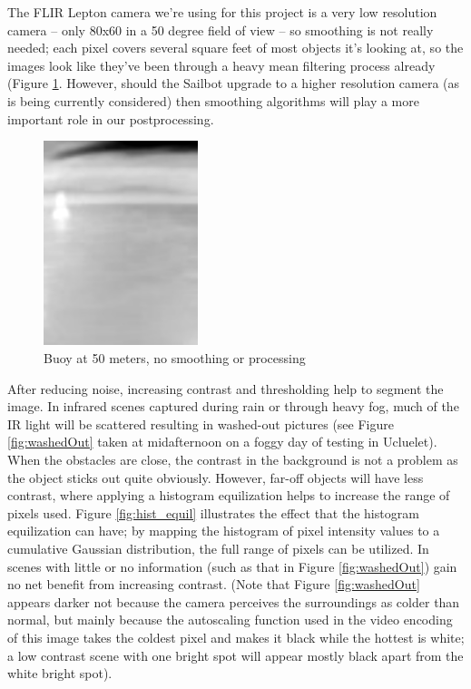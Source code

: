 The FLIR Lepton camera we're using for this project is a very low resolution camera -- only 80x60 in a 50 degree field of view -- so smoothing is not really needed; each pixel covers several square feet of most objects it's looking at, so the images look like they've been through a heavy mean filtering process already (Figure \ref{fig:buoy_ex}. However, should the Sailbot upgrade to a higher resolution camera (as is being currently considered) then smoothing algorithms will play a more important role in our postprocessing. 

\begin{figure}[h]
\centering
\includegraphics[width=0.4\textwidth]{"./image/buoy_example"}
\caption{Buoy at 50 meters, no smoothing or processing}
\label{fig:buoy_ex}
\end{figure}

After reducing noise, increasing contrast and thresholding help to segment the image. In infrared scenes captured during rain or through heavy fog, much of the IR light will be scattered resulting in washed-out pictures (see Figure \ref{fig:washedOut} taken at midafternoon on a foggy day of testing in Ucluelet). When the obstacles are close, the contrast in the background is not a problem as the object sticks out quite obviously. However, far-off objects will have less contrast, where applying a histogram equilization helps to increase the range of pixels used. Figure \ref{fig:hist_equil} illustrates the effect that the histogram equilization can have; by mapping the histogram of pixel intensity values to a cumulative Gaussian distribution, the full range of pixels can be utilized. In scenes with little or no information (such as that in Figure \ref{fig:washedOut}) gain no net benefit from increasing contrast. (Note that Figure \ref{fig:washedOut} appears darker not because the camera perceives the surroundings as colder than normal, but mainly because the autoscaling function used in the video encoding of this image takes the coldest pixel and makes it black while the hottest is white; a low contrast scene with one bright spot will appear mostly black apart from the white bright spot).


